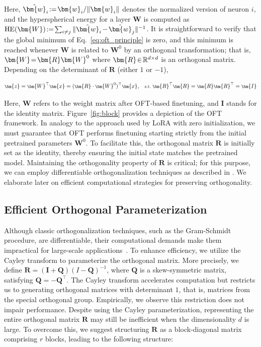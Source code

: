 Here, $\thickmuskip=2mu \medmuskip=2mu \hat{\bm{w}}_i:=\bm{w}_i/\|\bm{w}_i\|$ denotes the normalized version of neuron $i$, and the hyperspherical energy for a layer $\bm{W}$ is computed as $\thickmuskip=2mu \medmuskip=2mu \text{HE}(\bm{W}):= \sum_{i\neq j} \|\hat{\bm{w}}_i-\hat{\bm{w}}_j\|^{-1}$. It is straightforward to verify that the global minimum of Eq.~\eqref{eq:oft_principle} is zero, and this minimum is reached whenever $\bm{W}$ is related to $\bm{W}^0$ by an orthogonal transformation; that is, $\thickmuskip=2mu \medmuskip=2mu \bm{W}=\bm{R}\bm{W}^0$ where $\thickmuskip=2mu \medmuskip=2mu \bm{R}\in\mathbb{R}^{d\times d}$ is an orthogonal matrix. Depending on the determinant of $\bm{R}$ (either $1$ or $-1$),

\begin{equation}\label{eq:oft_general}
    \footnotesize
    \bm{z}=\bm{W}^\top\bm{x}=(\bm{R}\cdot\bm{W}^0)^\top\bm{x},~~~\text{s.t.}~\bm{R}^\top\bm{R}=\bm{R}\bm{R}^\top=\bm{I}
\end{equation}

Here, $\bm{W}$ refers to the weight matrix after OFT-based finetuning, and $\bm{I}$ stands for the identity matrix. Figure~\ref{fig:block} provides a depiction of the OFT framework. In analogy to the approach used by LoRA with zero initialization, we must guarantee that OFT performs finetuning starting strictly from the initial pretrained parameters $\bm{W}^0$. To facilitate this, the orthogonal matrix $\bm{R}$ is initially set as the identity, thereby ensuring the initial state matches the pretrained model. Maintaining the orthogonality property of $\bm{R}$ is critical; for this purpose, we can employ differentiable orthogonalization techniques as described in \cite{liu2021orthogonal,lezcano2019cheap}. We elaborate later on efficient computational strategies for preserving orthogonality.

\subsection{Efficient Orthogonal Parameterization}\label{sect:eff_ortho}

Although classic orthogonalization techniques, such as the Gram-Schmidt procedure, are differentiable, their computational demands make them impractical for large-scale applications~\cite{liu2021orthogonal}. To enhance efficiency, we utilize the Cayley transform to parameterize the orthogonal matrix. More precisely, we define $\bm{R}=(\bm{I}+\bm{Q})(I-\bm{Q})^{-1}$, where $\bm{Q}$ is a skew-symmetric matrix, satisfying $\bm{Q}=-\bm{Q}^\top$. The Cayley transform accelerates computation but restricts us to generating orthogonal matrices with determinant $1$, that is, matrices from the special orthogonal group. Empirically, we observe this restriction does not impair performance. Despite using the Cayley parameterization, representing the entire orthogonal matrix $\bm{R}$ may still be inefficient when the dimensionality $d$ is large. To overcome this, we suggest structuring $\bm{R}$ as a block-diagonal matrix comprising $r$ blocks, leading to the following structure:

